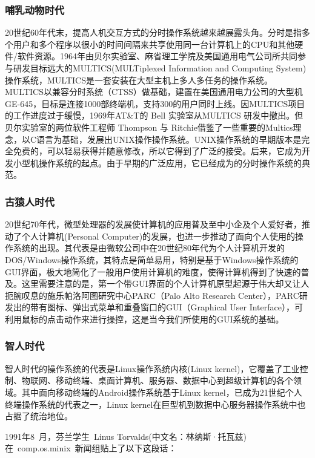 \subsubsection{哺乳动物时代}

20世纪60年代末，提高人机交互方式的分时操作系统越来越展露头角。分时是指多个用户和多个程序以很小的时间间隔来共享使用同一台计算机上的CPU和其他硬件/软件资源。1964年由贝尔实验室、麻省理工学院及美国通用电气公司所共同参与研发目标远大的MULTICS(MULTiplexed Information and Computing System)操作系统，MULTICS是一套安装在大型主机上多人多任务的操作系统。 MULTICS以兼容分时系统（CTSS）做基础，建置在美国通用电力公司的大型机GE-645，目标是连接1000部终端机，支持300的用户同时上线。因MULTICS项目的工作进度过于缓慢，1969年AT\&T的 Bell 实验室从MULTICS 研发中撤出。但贝尔实验室的两位软件工程师 Thompson 与 Ritchie借鉴了一些重要的Multics理念，以C语言为基础，发展出UNIX操作操作系统。UNIX操作系统的早期版本是完全免费的，可以轻易获得并随意修改，所以它得到了广泛的接受。后来，它成为开发小型机操作系统的起点。由于早期的广泛应用，它已经成为的分时操作系统的典范。

\subsubsection{古猿人时代}

20世纪70年代，微型处理器的发展使计算机的应用普及至中小企及个人爱好者，推动了个人计算机(Personal Computer)的发展，也进一步推动了面向个人使用的操作系统的出现。其代表是由微软公司中在20世纪80年代为个人计算机开发的DOS/Windows操作系统，其特点是简单易用，特别是基于Windows操作系统的GUI界面，极大地简化了一般用户使用计算机的难度，使得计算机得到了快速的普及。这里需要注意的是，第一个带GUI界面的个人计算机原型起源于伟大却又让人扼腕叹息的施乐帕洛阿图研究中心PARC（Palo Alto Research Center），PARC研发出的带有图标、弹出式菜单和重叠窗口的GUI（Graphical User Interface），可利用鼠标的点击动作来进行操控，这是当今我们所使用的GUI系统的基础。

\subsubsection{智人时代}

智人时代的操作系统的代表是Linux操作系统内核(Linux kernel)，它覆盖了工业控制、物联网、移动终端、桌面计算机、服务器、数据中心到超级计算机的各个领域。其中面向移动终端的Android操作系统基于Linux kernel，已成为21世纪个人终端操作系统的代表之一，Linux kernel在巨型机到数据中心服务器操作系统中也占据了统治地位。

1991年8 月，芬兰学生 Linus Torvalds(中文名：林纳斯·托瓦兹)在 comp.os.minix 新闻组贴上了以下这段话： 

